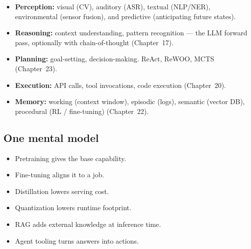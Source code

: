 \begin{center}
\end{center}

\begin{itemize}[leftmargin=1.5em]
  \item \textbf{Perception:} visual (CV), auditory (ASR), textual (NLP/NER),
    environmental (sensor fusion), and predictive (anticipating future states).
  \item \textbf{Reasoning:} context understanding, pattern recognition --- the LLM
    forward pass, optionally with chain-of-thought (Chapter~17).
  \item \textbf{Planning:} goal-setting, decision-making. ReAct, ReWOO, MCTS (Chapter~23).
  \item \textbf{Execution:} API calls, tool invocations, code execution (Chapter~20).
  \item \textbf{Memory:} working (context window), episodic (logs), semantic (vector DB),
    procedural (RL / fine-tuning) (Chapter~22).
\end{itemize}

\subsection{One mental model}

\begin{itemize}[leftmargin=1.5em]
    \item Pretraining gives the base capability.
    \item Fine-tuning aligns it to a job.
    \item Distillation lowers serving cost.
    \item Quantization lowers runtime footprint.
    \item RAG adds external knowledge at inference time.
    \item Agent tooling turns answers into actions.
\end{itemize}
